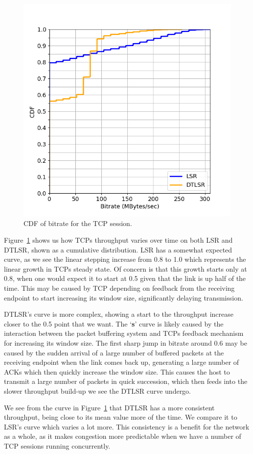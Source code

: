 \documentclass[withindex,glossary,openany]{cam-thesis}
\begin{document}
\begin{figure}[htb]
  \centering
  \includegraphics[width=0.6\linewidth]{tcp_throughput_flap2}
  \caption{CDF of bitrate for the TCP session.}
  \label{fig:tcp_throughput}
\end{figure}

Figure~\ref{fig:tcp_throughput} shows us how TCPs throughput varies over time on both LSR and DTLSR, shown as a cumulative distribution. LSR has a somewhat expected curve, as we see the linear stepping increase from 0.8 to 1.0 which represents the linear growth in TCPs steady state. Of concern is that this growth starts only at 0.8, when one would expect it to start at 0.5 given that the link is up half of the time. This may be caused by TCP depending on feedback from the receiving endpoint to start increasing its window size, significantly delaying transmission.

DTLSR's curve is more complex, showing a start to the throughput increase closer to the 0.5 point that we want. The `\textbf{s}' curve is likely caused by the interaction between the packet buffering system and TCPs feedback mechanism for increasing its window size. The first sharp jump in bitrate around 0.6 may be caused by the sudden arrival of a large number of buffered packets at the receiving endpoint when the link comes back up, generating a large number of ACKs which then quickly increase the window size. This causes the host to transmit a large number of packets in quick succession, which then feeds into the slower throughput build-up we see the DTLSR curve undergo.

We see from the curve in Figure~\ref{fig:tcp_throughput} that DTLSR has a more consistent throughput, being close to its mean value more of the time. We compare it to LSR's curve which varies a lot more. This consistency is a benefit for the network as a whole, as it makes congestion more predictable when we have a number of TCP sessions running concurrently.
\end{document}
